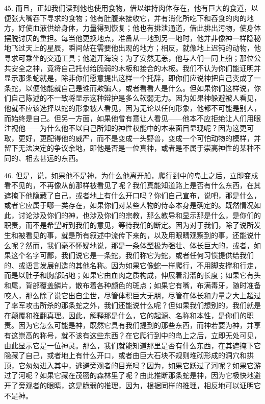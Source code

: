 45. 而且，正如我们读到他也使用食物，借以维持肉体存在，他有巨大的食道，以便张大嘴吞下寻求的食物；他有肚腹来接收它，并有消化所吃下和吞食的肉的地方，好使血液供给身体，力量得到恢复；他也有排泄通道，借此排出污物，使身体摆脱讨厌的重担。每当他更换地点，准备从一地到另一地时，他并非像神一样隐秘地飞过天上的星辰，瞬间站在需要他出现的地方；相反，就像地上迟钝的动物，他寻求可乘坐的交通工具；他避开海浪；为了安然无恙，他与人们一同上船；那位公共安全之神，竟将自己托付给脆弱的木板和接合的木板。我们不认为你们能证明并显示那条蛇就是，除非你们愿意提出这样一个托辞，即你们应说神把自己变成了一条蛇，以便他能就自己是谁而欺骗人，或者看看人是什么。但如果你们这样说，你们自己陈述的不一致将显示这种辩护是多么软弱无力。因为如果神躲避被人看见，他就不应该选择以蛇的形象被人看见，因为无论以任何形象，他都不可能是别人，而始终是自己。但另一方面，如果他曾有意让人看见——他本不应拒绝让人们用眼注视他——为什么他不以自己所知的神性权能中的本来面目显现呢？因为这更可取，更好，更配得他的威严，而不是变成一头野兽，变成一个可怕动物的模样，并留下无法决定的争议余地，即他是否是一位真神，或者是不属于崇高神性的某种不同的、相去甚远的东西。\par

46. 但是，说，如果他不是神，为什么他离开船，爬行到中的岛上之后，立即变成看不见的，不再像从前那样被看见了呢？我们真能知道路上是否有什么东西，在其遮掩下他隐藏了自己，或者地上有什么开口吗？你们自己宣布，说吧，那是什么，或者它应属于哪一类存在，如果你们对某些人物的侍奉本身是确定的。既然情况如此，讨论涉及你们的神，也涉及你们的宗教，那么教导和显示那是什么，是你们的职责，而不是希望听到我们的意见，等待我们的断定。因为对于我们，除了说所发生和被看见的事，就是所有叙述中流传下来的，以及用眼睛观察到的事，还能说什么呢？然而，我们毫不怀疑地说，那是一条体型极为强壮、体长巨大的，或者，如果这个名字可鄙，我们说它是一条蛇，我们称它为蛇，或者任何习惯提供给我们的、或语言发展创造的其他名称。因为如果它像蛇一样爬行，不用脚支撑和行走，而是以肚子和胸部贴地；如果它由血肉之质构成，伸展着滑溜的长度；如果它有头和尾，背部覆盖鳞片，散布着各种颜色的斑点；如果它有嘴，布满毒牙，随时准备咬人，那么除了说它出自尘世，尽管体积巨大无朋，尽管在体长和力量之大上超过了率军攻击所杀的那条蛇之外，我们还能说什么呢？但如果我们想别的，我们就是在颠覆和推翻真理。因此，解释那是什么，它的起源、名称和本性，是你们的职责。因为它怎么可能是神，既然它具有我们提到的那些东西，而神若要为神，并享有这崇高的称号，就不该有这些东西？在它爬行到中的岛上之后，立即无处可见，由此显示它是一位神灵。那么，我们就能知道那里是否有什么东西，在其遮掩下它隐藏了自己，或者地上有什么开口，或者由巨大石块不规则堆砌形成的洞穴和拱顶，它匆匆进入其中，逃避旁观者的目光吗？因为，如果它跃过了河呢？如果它游过了河呢？如果它藏在茂密的森林里了呢？由此推断那条蛇是神，因为它极快地避开了旁观者的眼睛，这是脆弱的推理，因为，根据同样的推理，相反地可以证明它不是神。\par

